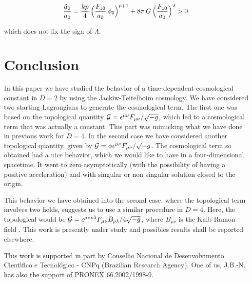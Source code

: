 \documentclass[a4paper,twocolumn,prd,groupedaddress,nofootinbib,showpacs]
{revtex4}
\begin{document}
\begin{equation}
\frac{\ddot a_0}{a_0}=\frac{kp}{4}\,
\Bigl(\frac{F_{10}}{a_0}\,\phi_0\Bigr)^{p+1}
+8\pi\,G\,\Bigl(\frac{F_{10}}{a_0}\Bigr)^2>0.
\end{equation}

\noindent
which does not fix the sign of $\Lambda$.

\section{Conclusion}

In this paper we have studied the behavior of a time-dependent
cosmological constant in $D=2$ by using the Jackiw-Teitelboim
cosmology. We have considered two starting Lagrangians to generate the
cosmological term. The first one was based on the topological quantity
${\cal G}=\epsilon^{\mu\nu}F_{\mu\nu}/\sqrt{-g}$, which led to a
cosmological term that was actually a constant. This part was
mimicking what we have done in previous work for $D=4$. In the second
case we have considered another topological quantity, given by
${\cal G}=\phi\epsilon^{\mu\nu}F_{\mu\nu}/\sqrt{-g}$. The cosmological
term so obtained had a nice behavior, which we would like to have in a
four-dimensional spacetime. It went to zero asymptotically (with the
possibility of having a positive acceleration) and with singular or
non singular solution closed to the origin.

\medskip
This behavior we have obtained into the second case, where the
topological term involves two fields, suggests us to use a similar
procedure in $D=4$. Here, the topological would be ${\cal G}=
\epsilon^{\mu\nu\rho\lambda}F_{\mu\nu}B_{\rho\lambda}/4\sqrt{-g}$,
where $B_{\mu\nu}$ is the Kalb-Ramon field \cite{Kalb}. This work is
presently under study and possibles results shall be reported
elsewhere.

\bigskip
\begin{acknowledgments}
This work is supported in part by Conselho Nacional de Desenvolvimento
Cient\'{\i}fico e Tecnol\'ogico - CNPq (Brazilian Research Agency).
One of us, J.B.-N. has also the support of PRONEX 66.2002/1998-9.
\end{acknowledgments}
\end{document}

